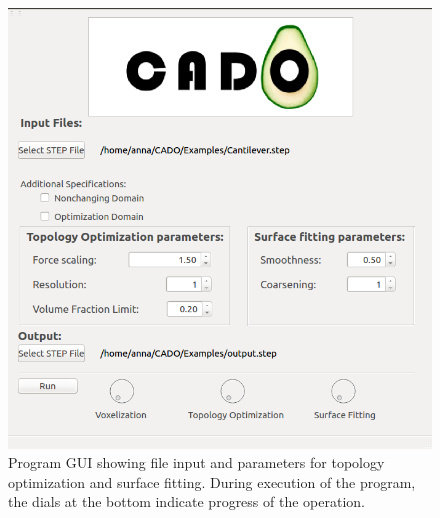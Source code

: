 \begin{figure}[h]
\centering
\includegraphics[scale=0.5]{Pictures/CADO_mainWindowParameters.png}
\caption{Program GUI showing file input and parameters for topology optimization and surface fitting. During execution of the program, the dials at the bottom indicate progress of the operation.}
\label{fig:mainWindowParameters}
\end{figure}
